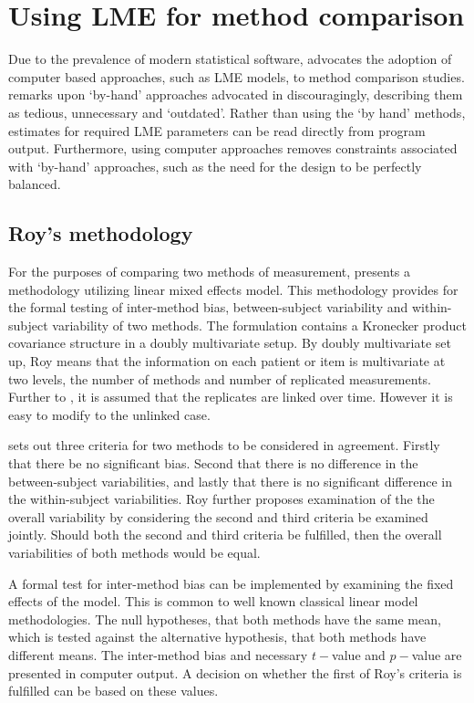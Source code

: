 \documentclass[12pt, a4paper]{report}
\theoremstyle{plain}
\theoremstyle{definition}
\theoremstyle{remark}
\begin{document}
\section{Using LME for method comparison}
Due to the prevalence of modern statistical software, \citet{BXC2008} advocates the adoption of computer based approaches, such as LME models, to method comparison studies. \citet{BXC2008} remarks upon `by-hand' approaches advocated in \citet{BA99} discouragingly, describing them as tedious, unnecessary and `outdated'. Rather than using the `by hand' methods, estimates for required LME parameters can be read directly from program output. Furthermore, using computer approaches removes constraints associated with `by-hand' approaches, such as the need for the design to be perfectly balanced.

\subsection{Roy's methodology}

For the purposes of comparing two methods of measurement, \citet{roy} presents a methodology utilizing linear mixed effects model. This methodology provides for the formal testing of inter-method bias, between-subject variability and within-subject variability of two methods. The formulation contains a Kronecker product covariance structure in a doubly multivariate setup. By doubly multivariate set up, Roy means that the information on each patient or item is multivariate at two levels, the number of methods and number of replicated measurements. Further to \citet{lam}, it is assumed that the replicates are linked over time. However it is easy to modify to the unlinked case.

\citet{roy} sets out three criteria for two methods to be considered in agreement. Firstly that there be no significant bias. Second that there is no difference in the between-subject variabilities, and lastly that there is no significant difference in the within-subject variabilities. Roy further proposes examination of the the overall variability by considering the second and third criteria be examined jointly. Should both the second and third criteria be fulfilled, then the overall variabilities of both methods would be equal.

A formal test for inter-method bias can be implemented by examining the fixed effects of the model. This is common to well known classical linear model methodologies. The null hypotheses, that both methods have the same mean, which is tested against the alternative hypothesis, that both methods have different means.
The inter-method bias and necessary $t-$value and $p-$value are presented in computer output. A decision on whether the first of Roy's criteria is fulfilled can be based on these values.
\end{document}
